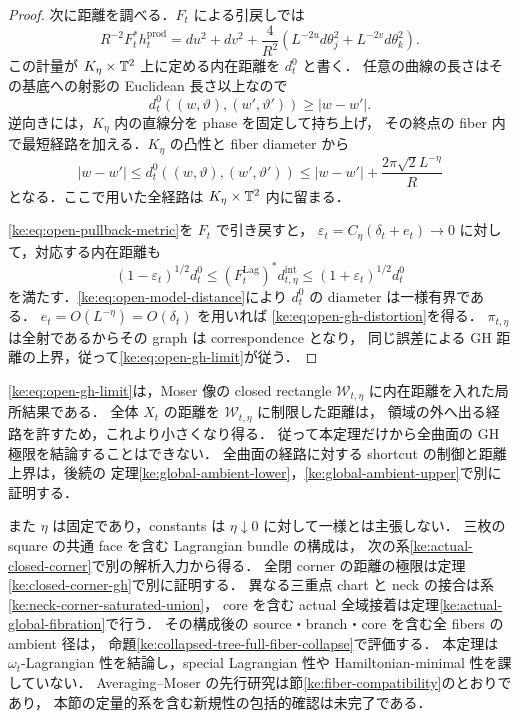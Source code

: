 \begin{proof}
次に距離を調べる．$F_t$ による引戻しでは
\begin{equation}\label{ke:eq:open-scaled-product}
 R^{-2}F_t^*h_t^{\mathrm{prod}}
 =du^2+dv^2
  +\frac4{R^2}\left(L^{-2u}d\theta_j^2+L^{-2v}d\theta_k^2\right).
\end{equation}
この計量が $K_\eta\times\mathbb T^2$ 上に定める内在距離を $d_t^0$ と書く．
任意の曲線の長さはその基底への射影の Euclidean 長さ以上なので
\[
 d_t^0((w,\vartheta),(w',\vartheta'))\ge|w-w'|.
\]
逆向きには，$K_\eta$ 内の直線分を phase を固定して持ち上げ，
その終点の fiber 内で最短経路を加える．$K_\eta$ の凸性と fiber diameter から
\begin{equation}\label{ke:eq:open-model-distance}
 |w-w'|
 \le d_t^0((w,\vartheta),(w',\vartheta'))
 \le |w-w'|+\frac{2\pi\sqrt2 L^{-\eta}}R
\end{equation}
となる．ここで用いた全経路は $K_\eta\times\mathbb T^2$ 内に留まる．

\eqref{ke:eq:open-pullback-metric}を $F_t$ で引き戻すと，
$\varepsilon_t=C_\eta(\delta_t+e_t)\to0$ に対して，対応する内在距離も
\[
 (1-\varepsilon_t)^{1/2}d_t^0
 \le (F_t^{\mathrm{Lag}})^*d_{t,\eta}^{\mathrm{int}}
 \le (1+\varepsilon_t)^{1/2}d_t^0
\]
を満たす．\eqref{ke:eq:open-model-distance}により $d_t^0$ の diameter は一様有界である．
$e_t=O(L^{-\eta})=O(\delta_t)$ を用いれば
\eqref{ke:eq:open-gh-distortion}を得る．
$\pi_{t,\eta}$ は全射であるからその graph は correspondence となり，
同じ誤差による GH 距離の上界，従って\eqref{ke:eq:open-gh-limit}が従う．
\end{proof}

\begin{remark}[距離と適用範囲の区別]
\label{ke:open-cell-scope}
\eqref{ke:eq:open-gh-limit}は，Moser 像の closed rectangle
$\mathcal W_{t,\eta}$ に内在距離を入れた局所結果である．
全体 $X_t$ の距離を $\mathcal W_{t,\eta}$ に制限した距離は，
領域の外へ出る経路を許すため，これより小さくなり得る．
従って本定理だけから全曲面の GH 極限を結論することはできない．
全曲面の経路に対する shortcut の制御と距離上界は，後続の
定理\ref{ke:global-ambient-lower}，\ref{ke:global-ambient-upper}で別に証明する．

また $\eta$ は固定であり，constants は $\eta\downarrow0$ に対して一様とは主張しない．
三枚の square の共通 face を含む Lagrangian bundle の構成は，
次の系\ref{ke:actual-closed-corner}で別の解析入力から得る．
全閉 corner の距離の極限は定理\ref{ke:closed-corner-gh}で別に証明する．
異なる三重点 chart と neck の接合は系\ref{ke:neck-corner-saturated-union}，
core を含む actual 全域接着は定理\ref{ke:actual-global-fibration}で行う．
その構成後の source・branch・core を含む全 fibers の ambient 径は，
命題\ref{ke:collapsed-tree-full-fiber-collapse}で評価する．
本定理は $\omega_t$-Lagrangian 性を結論し，special Lagrangian 性や
Hamiltonian-minimal 性を課していない．
Averaging--Moser の先行研究は節\ref{ke:fiber-compatibility}のとおりであり，
本節の定量的系を含む新規性の包括的確認は未完了である．
\end{remark}

